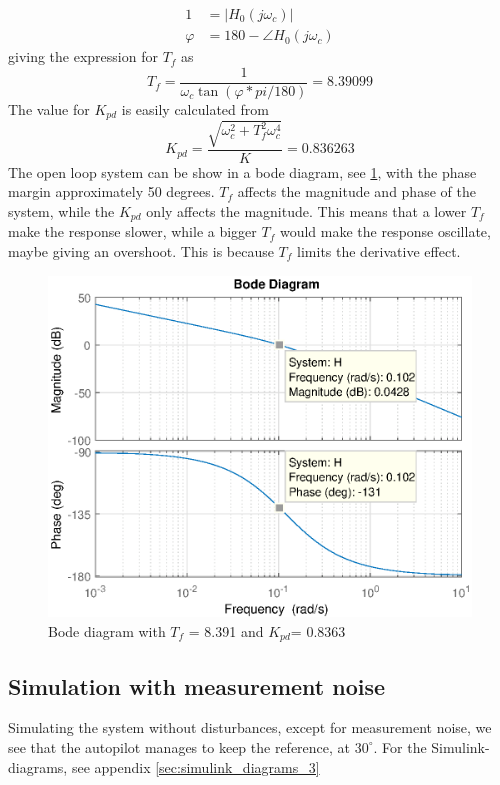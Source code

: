 \begin{equation}
    \begin{split}
        1 &= |H_0(j\omega_{c})| \\
      \varphi &= 180 - \angle H_0(j\omega_c)
    \end{split}
\end{equation}
giving the expression for $T_f$ as
\begin{equation}
    T_f = \frac{1}{\omega_c\tan(\varphi*pi/180)}= 8.39099 
\end{equation}
The value for $K_{pd}$ is easily calculated from 
\begin{equation}
    K_{pd} = \frac{\sqrt{\omega_c^2 + T_f^2 \omega_c^4}}{K}= 0.836263
\end{equation}
The open loop system can be show in a bode diagram, see \cref{fig:bode}, with the phase margin approximately 50 degrees. $T_f$ affects the magnitude and phase of the system, while the $K_{pd}$ only affects the magnitude. This means that a lower $T_f$ make the response slower, while a bigger $T_f$ would make the response oscillate, maybe giving an overshoot. This is because $T_f$ limits the derivative effect.
\begin{figure}[H]
    \centering
    \includegraphics[width=0.75\linewidth]{Part3_pics/bode_nr2.eps}
    \caption{Bode diagram with $T_f$ = 8.391 and $K_{pd}$= 0.8363}
    \label{fig:bode}
\end{figure}



\subsection{Simulation with measurement noise}
Simulating the system without disturbances, except for measurement noise, we see that the autopilot manages to keep the reference, at $30^\circ$. For the Simulink- diagrams, see appendix \ref{sec:simulink_diagrams_3}

